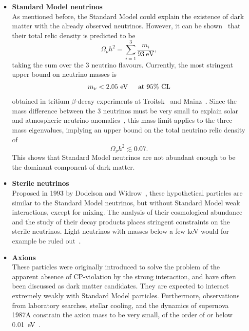 \begin{itemize}
 \item[] \textbf{Standard Model neutrinos}\\
	As mentioned before, the Standard Model could explain the existence of dark matter with the already observed neutrinos. However, it can be shown~\cite{Bergstrom:2000pn} that their total relic density is predicted to be 
	\begin{equation}
	 \Omega_{\nu}h^2 = \sum_{i = 1}^3 \frac{m_i}{93\ \mathrm{eV}},
	\end{equation}
	taking the sum over the 3 neutrino flavours. Currently, the most stringent upper bound on neutrino masses is
	\begin{equation}
	 m_{\nu} < 2.05\ \text{eV \hspace{.3cm} at 95\% CL}
	\end{equation}
	obtained in tritium $\beta$-decay experiments at Troitsk~\cite{Lobashev:2003kt,Aseev:2011dq} and Mainz~\cite{Kraus:2004zw}. Since the mass difference between the 3 neutrinos must be very small to explain solar and atmospheric neutrino anomalies~\cite{GonzalezGarcia:2002dz}, this mass limit applies to the three mass eigenvalues, implying an upper bound on the total neutrino relic density of 
	\begin{equation}
	  \Omega_{\nu}h^2 \lesssim 0.07.
	\end{equation}
	This shows that Standard Model neutrinos are not abundant enough to be the dominant component of dark matter.
	
 \item[] \textbf{Sterile neutrinos}\\
         Proposed in 1993 by Dodelson and Widrow~\cite{Dodelson:1993je}, these hypothetical particles are similar to the Standard Model neutrinos, but without Standard Model weak interactions, except for mixing. The analysis of their cosmological abundance and the study of their decay products places stringent constraints on the sterile neutrinos. Light neutrinos with masses below a few keV would for example be ruled out~\cite{Yoshida:2003rm}.
         
 \item[] \textbf{Axions}\\
         These particles were originally introduced to solve the problem of the apparent absence of CP-violation by the strong interaction, and have often been discussed as dark matter candidates. They are expected to interact extremely weakly with Standard Model particles. Furthermore, observations from laboratory searches, stellar cooling, and the dynamics of supernova 1987A constrain the axion mass to be very small, of the order of or below 0.01~eV~\cite{Rosenberg:2000wb}.
         

\end{itemize}
